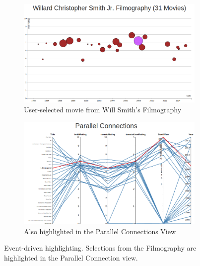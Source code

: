\documentclass[12pt]{article}
\begin{document}
\begin{figure}[h!]
		\centering
		\begin{subfigure}[t]{.5\textwidth}
		  \centering
		  \includegraphics[width=\linewidth]{images/TimelineSelection.png}
		  \caption{User-selected movie from Will Smith's Filmography}
		  \label{fig:ftpha}
		\end{subfigure}%
		\begin{subfigure}[t]{.6\textwidth}
		  \centering
		  \includegraphics[width=\linewidth]{images/pacHighlight.png}
		  \caption{Also highlighted in the Parallel Connections View}
		  \label{fig:ftphb}
		\end{subfigure}%
		\caption{Event-driven highlighting.  Selections from the Filmography are highlighted in the Parallel Connection view.}
		\label{fig:filmToParallelHighlight}
	\end{figure}
\end{document}
